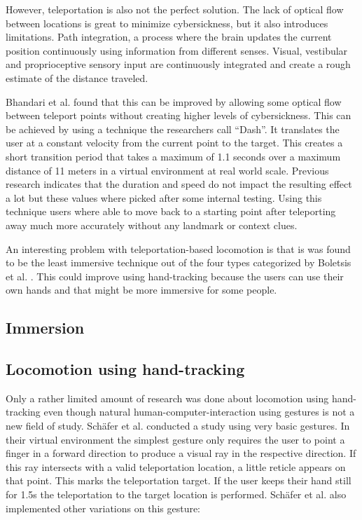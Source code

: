 However, teleportation is also not the perfect solution. 
The lack of optical flow between locations is great to minimize
cybersickness, but it also introduces limitations. 
Path integration, a process where the brain updates the current position
continuously using information from different senses. Visual, vestibular
and proprioceptive sensory input are continuously integrated and create
a rough estimate of the distance traveled. \cite{Bhandari}

Bhandari et al. \cite{Bhandari} found that this can be improved by allowing some optical
flow between teleport points without creating higher levels of
cybersickness. This can be achieved by using a technique the researchers
call ``Dash''. It translates the user at a constant velocity from the
current point to the target. This creates a short transition period that
takes a maximum of 1.1 seconds over a maximum distance of 11 meters in a
virtual environment at real world scale. Previous research indicates
that the duration and speed do not impact the resulting effect a lot
\cite{Bowman} but these values where picked after some
internal testing. Using this technique users where able to move back to
a starting point after teleporting away much more accurately without any
landmark or context clues. 

An interesting problem with teleportation-based locomotion is that is
was found to be the least immersive technique out of the four types
categorized by Boletsis et al. \cite{Boletsis}. This
could improve using hand-tracking because the users can use their own
hands and that might be more immersive for some people. %

\subsection{Immersion}\label{immersion}


\subsection{Locomotion using hand-tracking}\label{locomotion-using-hand-tracking}

Only a rather limited amount of research was done about locomotion using hand-tracking even though natural human-computer-interaction using gestures is not a new field of study. Schäfer et al. \cite{Schafer2021} conducted a study using very basic gestures. In their virtual environment the simplest gesture only requires the user to point a finger in a forward direction to produce a visual ray in the respective direction. If this ray intersects with a valid teleportation location, a little reticle appears on that point. This marks the teleportation target. If the user keeps their hand still for 1.5s the teleportation to the target location is performed. Schäfer et al. also implemented other variations on this gesture:

